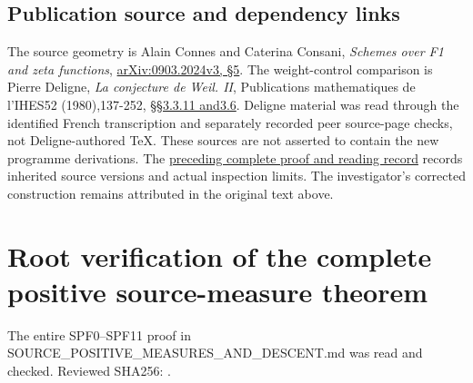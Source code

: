 \section{Publication source and dependency
links}\label{publication-source-and-dependency-links-12}

The source geometry is Alain Connes and Caterina Consani, \emph{Schemes
over F1 and zeta functions},
\href{https://arxiv.org/abs/0903.2024v3}{arXiv:0903.2024v3, §5}. The
weight-control comparison is Pierre Deligne, \emph{La conjecture de
Weil. II}, Publications mathematiques de l'IHES52 (1980),137-252,
\href{https://www.numdam.org/item/PMIHES_1980__52__137_0/}{§§3.3.11
and3.6}. Deligne material was read through the identified French
transcription and separately recorded peer source-page checks, not
Deligne-authored TeX. These sources are not asserted to contain the new
programme derivations. The
\href{https://github.com/KokunoYumeto/zeta-function-research-reader/blob/36a82ecca98addb8a98b48204e349737856c7223/workbenches/splitzero-tandem/continuations/20260924-cohomology-weight-and-character-lifts/BUILD_AND_REVIEW.md}{preceding
complete proof and reading record} records inherited source versions and
actual inspection limits. The investigator's corrected construction
remains attributed in the original text above.

\chapter{Root verification of the complete positive source-measure
theorem}\label{root-verification-of-the-complete-positive-source-measure-theorem}

The entire SPF0--SPF11 proof in
SOURCE\_POSITIVE\_MEASURES\_AND\_DESCENT.md was read and checked.
Reviewed SHA256:
.

